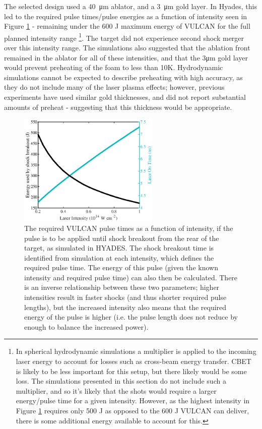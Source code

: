 The selected design used a 40~\unit{\micro\meter} ablator, and a 3~\unit{\micro\meter} gold layer. In Hyades, this led to the required pulse times/pulse energies as a function of intensity seen in Figure \ref{fig:VULCAN energy} - remaining under the 600 J maximum energy of VULCAN for the full planned intensity range \footnote{In spherical hydrodynamic simulations a multiplier is applied to the incoming laser energy to account for losses such as cross-beam energy transfer. CBET is likely to be less important for this setup, but there likely would be some loss. The simulations presented in this section do not include such a multiplier, and so it's likely that the shots would require a larger energy/pulse time for a given intensity. However, as the highest intensity in Figure \ref{fig:VULCAN energy} requires only 500 J as opposed to the 600 J VULCAN can deliver, there is some additional energy available to account for this. }. The target did not experience second shock merger over this intensity range. The simulations also suggested that the ablation front remained in the ablator for all of these intensities, and that the 3\unit{\micro\meter} gold layer would prevent preheating of the foam to less than 10K. Hydrodynamic simulations cannot be expected to describe preheating with high accuracy, as they do not include many of the laser plasma effects; however, previous experiments have used similar gold thicknesses, and did not report substantial amounts of preheat - suggesting that this thickness would be appropriate.


\begin{figure}[hbt!]
\centering
\includegraphics[width=0.6\textwidth]{figures/Experiment/EnergyandPulsetimes_edit.eps}%
\caption{\label{fig:VULCAN energy} The required VULCAN pulse times as a function of intensity, if the pulse is to be applied until shock breakout from the rear of the target, as simulated in HYADES. The shock breakout time is identified from simulation at each intensity, which defines the required pulse time. The energy of this pulse (given the known intensity and required pulse time) can also then be calculated. There is an inverse relationship between these two parameters; higher intensities result in faster shocks (and thus shorter required pulse lengths), but the increased intensity also means that the required energy of the pulse is higher (i.e. the pulse length does not reduce by enough to balance the increased power).}
\end{figure}

